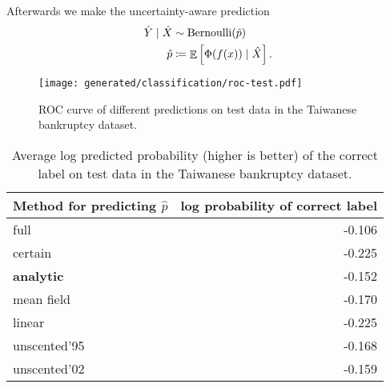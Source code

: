 \documentclass{article}
\DeclareMathOperator{\expect}{\mathbb{E}}
\DeclareMathOperator{\Var}{\operatorname{Var}}
\begin{document}
Afterwards we make the uncertainty-aware prediction
\begin{align}
  \hat Y \mid \hat X &\sim \operatorname{Bernoulli}(\hat p)
  \\
  \hat p &\coloneqq \expect\sbr{\Phi(f(x)) \mid \hat X}.
  \label{eq:classification-mean}
\end{align}

\begin{figure}
  \begin{center}
    \texttt{[image: generated/classification/roc-test.pdf]}
  \end{center}
  \caption{\label{fig:classification-roc-test}ROC curve of different predictions on test data in the Taiwanese bankruptcy dataset.}
\end{figure}

\begin{table}
  \begin{center}
    \begin{tabular}{lr}
      \toprule
      Method for predicting \(\hat p\) & log probability of correct label \\
      \midrule
      full & -0.106 \\
      certain & -0.225 \\
      \midrule
      {\bfseries analytic} & -0.152 \\
      mean field & -0.170 \\
      linear & -0.225 \\
      unscented'95 & -0.168 \\
      unscented'02 & -0.159 \\
      \bottomrule
    \end{tabular}    
  \end{center}
  \caption{\label{tab:classification-log-probability}Average log predicted probability (higher is better) of the correct label on test data in the Taiwanese bankruptcy dataset.}
\end{table}
\end{document}
